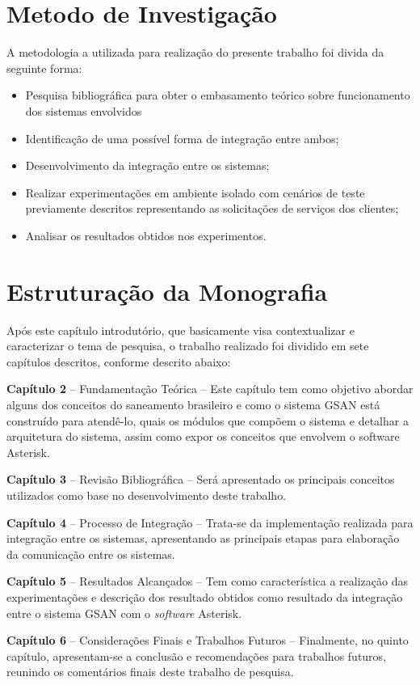 \section*{Metodo de Investigação}
A metodologia a utilizada para realização do presente trabalho foi divida da seguinte forma:
\begin{itemize}
	\item Pesquisa bibliográfica para obter o embasamento teórico sobre funcionamento dos sistemas envolvidos
	\item Identificação de uma possível forma de integração entre ambos;
	\item Desenvolvimento da integração entre os sistemas;
	\item Realizar experimentações em ambiente isolado com cenários de teste previamente descritos representando as solicitações de serviços dos clientes; 
	\item Analisar os resultados obtidos nos experimentos.
\end{itemize}

\section*{Estruturação da Monografia}
	
Após este capítulo introdutório, que basicamente visa contextualizar e caracterizar o tema de pesquisa, o trabalho realizado foi dividido em sete capítulos descritos, conforme descrito abaixo:
\begin{description}
	\item \textbf{Capítulo 2} – Fundamentação Teórica – Este capítulo tem como objetivo abordar alguns dos conceitos do saneamento brasileiro e como o sistema GSAN está construído para atendê-lo, quais os módulos que compõem o sistema e detalhar a arquitetura do sistema, assim como expor os conceitos que envolvem o software Asterisk.
	\item \textbf{Capítulo 3 } – Revisão Bibliográfica – Será apresentado os principais conceitos utilizados como base no desenvolvimento deste trabalho.
	\item \textbf{Capítulo  4} – Processo de Integração – Trata-se da implementação realizada para integração entre os sistemas, apresentando as principais etapas para elaboração da comunicação entre os sistemas.
	\item \textbf{Capítulo  5} – Resultados Alcançados – Tem como característica a realização das experimentações e descrição dos resultado obtidos como resultado da integração entre o sistema GSAN com o \textit{software} Asterisk.
	\item \textbf{Capítulo 6} – Considerações Finais e Trabalhos Futuros – Finalmente, no quinto capítulo, apresentam-se a conclusão e recomendações para trabalhos futuros, reunindo os comentários finais deste trabalho de pesquisa.	
\end{description}
	





